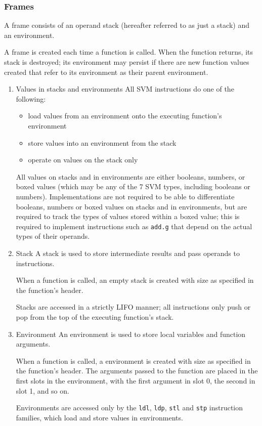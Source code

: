 \subsubsection{Frames}
\label{sec:org6149cad}
A frame consists of an operand stack (hereafter referred to as just a
stack) and an environment.

A frame is created each time a function is called. When the function
returns, its stack is destroyed; its environment may persist if there
are new function values created that refer to its environment as their
parent environment.

\begin{enumerate}
\item Values in stacks and environments
\label{sec:org806609b}
All SVM instructions do one of the following:

\begin{itemize}
\item load values from an environment onto the executing function's
environment
\item store values into an environment from the stack
\item operate on values on the stack only
\end{itemize}

All values on stacks and in environments are either booleans, numbers,
or boxed values (which may be any of the 7 SVM types, including booleans
or numbers). Implementations are not required to be able to
differentiate booleans, numbers or boxed values on stacks and in
environments, but are required to track the types of values stored
within a boxed value; this is required to implement instructions such as
\texttt{add.g} that depend on the actual types of their operands.

\item Stack
\label{sec:org1887c3f}
A stack is used to store intermediate results and pass operands to
instructions.

When a function is called, an empty stack is created with size as
specified in the function's header.

Stacks are accessed in a strictly LIFO manner; all instructions only
push or pop from the top of the executing function's stack.

\item Environment
\label{sec:org3d9330d}
An environment is used to store local variables and function arguments.

When a function is called, a environment is created with size as
specified in the function's header. The arguments passed to the function
are placed in the first slots in the environment, with the first
argument in slot 0, the second in slot 1, and so on.

Environments are accessed only by the \texttt{ldl}, \texttt{ldp}, \texttt{stl} and \texttt{stp}
instruction families, which load and store values in environments.
\end{enumerate}

